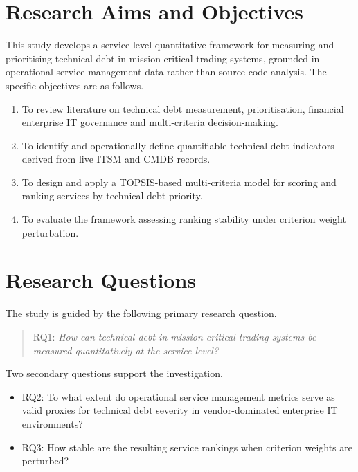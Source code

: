 \documentclass[
  12pt,
  letterpaper,
  12pt,
  oneside,
  english,
  onehalfspacing,
  headsepline]{MastersDoctoralThesis}
\providecommand{\tightlist}{%
  \setlength{\itemsep}{0pt}\setlength{\parskip}{0pt}}
\begin{document}
\section{Research Aims and
Objectives}\label{research-aims-and-objectives}

This study develops a service-level quantitative framework for measuring
and prioritising technical debt in mission-critical trading systems,
grounded in operational service management data rather than source code
analysis. The specific objectives are as follows.

\begin{enumerate}
\def\labelenumi{\arabic{enumi}.}
\tightlist
\item
  To review literature on technical debt measurement, prioritisation,
  financial enterprise IT governance and multi-criteria decision-making.
\item
  To identify and operationally define quantifiable technical debt
  indicators derived from live ITSM and CMDB records.
\item
  To design and apply a TOPSIS-based multi-criteria model for scoring
  and ranking services by technical debt priority.
\item
  To evaluate the framework assessing ranking stability under criterion
  weight perturbation.
\end{enumerate}

\section{Research Questions}\label{research-questions}

The study is guided by the following primary research question.

\begin{quote}
RQ1: \emph{How can technical debt in mission-critical trading systems be
measured quantitatively at the service level?}
\end{quote}

Two secondary questions support the investigation.

\begin{itemize}
\tightlist
\item
  RQ2: To what extent do operational service management metrics serve as
  valid proxies for technical debt severity in vendor-dominated
  enterprise IT environments?
\item
  RQ3: How stable are the resulting service rankings when criterion
  weights are perturbed?
\end{itemize}
\end{document}
